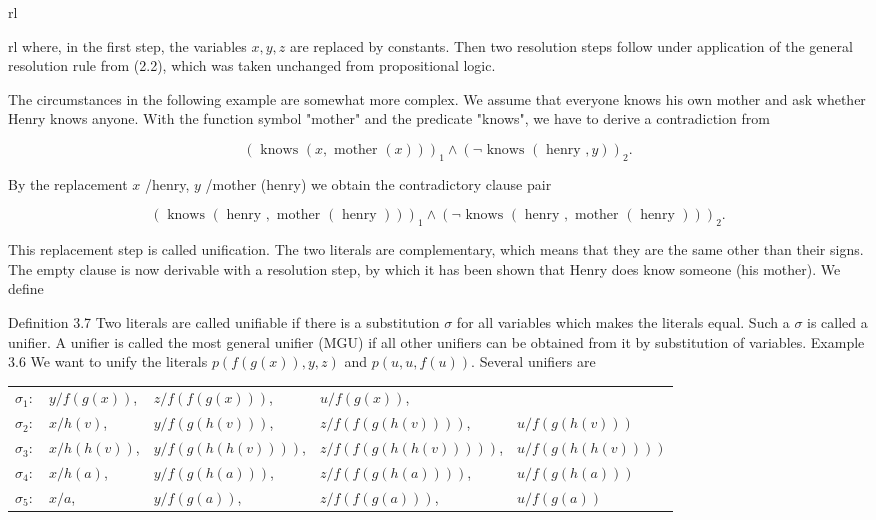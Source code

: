 \documentclass[10pt]{book}
\begin{document}
\begin{center}
\begin{tabular}{rl}
\begin{tabular}{rl}
where, in the first step, the variables $x, y, z$ are replaced by constants. Then two resolution steps follow under application of the general resolution rule from (2.2), which was taken unchanged from propositional logic.

The circumstances in the following example are somewhat more complex. We assume that everyone knows his own mother and ask whether Henry knows anyone. With the function symbol "mother" and the predicate "knows", we have to derive a contradiction from

$$
(\text { knows }(x, \text { mother }(x)))_{1} \wedge(\neg \text { knows }(\text { henry }, y))_{2} .
$$

By the replacement $x$ /henry, $y$ /mother (henry) we obtain the contradictory clause pair

$$
(\text { knows }(\text { henry }, \text { mother }(\text { henry })))_{1} \wedge(\neg \text { knows }(\text { henry }, \text { mother }(\text { henry })))_{2} .
$$

This replacement step is called unification. The two literals are complementary, which means that they are the same other than their signs. The empty clause is now derivable with a resolution step, by which it has been shown that Henry does know someone (his mother). We define

Definition 3.7 Two literals are called unifiable if there is a substitution $\sigma$ for all variables which makes the literals equal. Such a $\sigma$ is called a unifier. A unifier is called the most general unifier (MGU) if all other unifiers can be obtained from it by substitution of variables.
Example 3.6 We want to unify the literals $p(f(g(x)), y, z)$ and $p(u, u, f(u))$. Several unifiers are

\begin{center}
\begin{tabular}{lllll}
$\sigma_{1}:$ & $y / f(g(x))$, & $z / f(f(g(x)))$, & $u / f(g(x))$, &  \\
$\sigma_{2}:$ & $x / h(v)$, & $y / f(g(h(v)))$, & $z / f(f(g(h(v))))$, & $u / f(g(h(v)))$ \\
$\sigma_{3}:$ & $x / h(h(v))$, & $y / f(g(h(h(v))))$, & $z / f(f(g(h(h(v)))))$, & $u / f(g(h(h(v))))$ \\
$\sigma_{4}:$ & $x / h(a)$, & $y / f(g(h(a)))$, & $z / f(f(g(h(a))))$, & $u / f(g(h(a)))$ \\
$\sigma_{5}:$ & $x / a$, & $y / f(g(a))$, & $z / f(f(g(a)))$, & $u / f(g(a))$ \\
\end{tabular}
\end{center}


\end{tabular}
\end{tabular}
\end{center}
\end{document}
